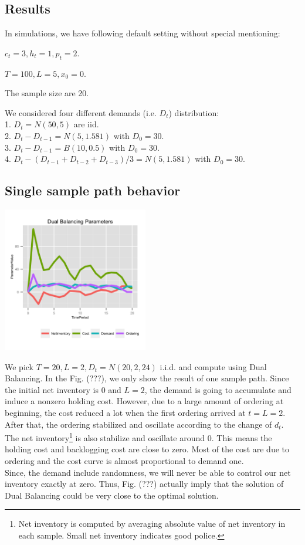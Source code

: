 \documentclass[twoside]{article}
\begin{document}
\begin{multicols}{2}
\section{Results}

In simulations, we have following default setting without special mentioning:
\begin{compactitem}
      \item $c_t = 3, h_t = 1, p_t = 2$.
      \item $T = 100, L = 5, x_0 = 0$.
      \item The sample size are 20.
      \item We considered four different demands (i.e. $D_t$) distribution:\\
            1. $D_t = N(50,5)$ are iid.\\
            2. $D_t-D_{t-1} = N(5,1.581)$ with $D_0=30$.\\
            3. $D_t-D_{t-1} = B(10,0.5)$ with $D_0=30$.\\
            4. $D_t- (D_{t-1} + D_{t-2} + D_{t-3})/3 = N(5,1.581)$ with $D_0=30$.
\end{compactitem}
\subsection{Single sample path behavior}
  \includegraphics[width=2.5in]{figures/DualBalancingParameters.png}

We pick $T=20,L=2,D_t=N(20,2,24)$ i.i.d. and compute using Dual Balancing. In the Fig. (???), we only show the result of one sample path. Since the initial net inventory is 0 and $L=2$, the demand is going to accumulate and induce a nonzero holding cost. However, due to a large amount of ordering at beginning, the cost reduced a lot when the first ordering arrived at $t=L=2$. After that, the ordering stabilized and oscillate according to the change of $d_t$. The net inventory\footnote{Net inventory is computed by averaging absolute value of net inventory in each sample. Small net inventory indicates good police.} is also stabilize and oscillate around 0. This means the holding cost and backlogging cost are close to zero. Most of the cost are due to ordering and the cost curve is almost proportional to demand one.\\
Since, the demand include randomness, we will never be able to control our net inventory exactly at zero. Thus, Fig. (???) actually imply that the solution of Dual Balancing could be very close to the optimal solution.

\end{multicols}
\end{document}
